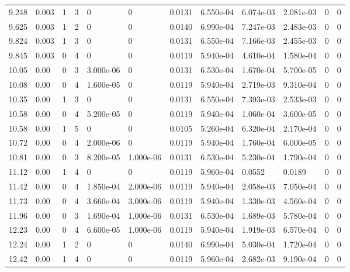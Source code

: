 \documentclass[preview]{standalone}
\begin{document}
{{{\begin{tabular}{L{1.2cm}C{1.2cm} C{0.3cm}C{0.5cm} C{1.4cm}C{1.4cm} C{1.4cm}C{1.4cm} C{1.6cm}C{1.6cm} C{1.6cm}C{1.6cm}}
  9.248  &  0.003  & 1     &  3 &  0  & 0  &  0.0131&   6.550e-04& 6.074e-03 & 2.081e-03   &  0 & 0  \\ 
  9.625  &  0.003  & 1     &  2 &  0  & 0  &  0.0140&   6.990e-04& 7.247e-03 & 2.483e-03   &  0 & 0  \\ 
  9.824  &  0.003  & 1     &  3 &  0  & 0  &  0.0131&   6.550e-04& 7.166e-03 & 2.455e-03   &  0 & 0  \\ 
  9.845  &  0.003  & 0     &  4 &  0  & 0  &  0.0119&   5.940e-04& 4.610e-04 & 1.580e-04   &  0 & 0  \\ 
  10.05  &  0.00  & 0     &  3 &  3.000e-06  & 0  &  0.0131&   6.530e-04& 1.670e-04 & 5.700e-05   &  0 & 0  \\ 
  10.08  &  0.00  & 0     &  4 &  1.600e-05  & 0  &  0.0119&   5.940e-04& 2.719e-03 & 9.310e-04   &  0 & 0  \\ 
  10.35  &  0.00  & 1     &  3 &  0  & 0  &  0.0131&   6.550e-04& 7.393e-03 & 2.533e-03   &  0 & 0  \\ 
  10.58  &  0.00  & 0     &  4 &  5.200e-05  & 0  &  0.0119&   5.940e-04& 1.060e-04 & 3.600e-05   &  0 & 0  \\ 
  10.58  &  0.00  & 1     &  5 &  0  & 0  &  0.0105&   5.260e-04& 6.320e-04 & 2.170e-04   &  0 & 0  \\ 
  10.72  &  0.00  & 0     &  4 &  2.000e-06  & 0  &  0.0119&   5.940e-04& 1.760e-04 & 6.000e-05   &  0 & 0  \\ 
  10.81  &  0.00  & 0     &  3 &  8.200e-05  & 1.000e-06  &  0.0131&   6.530e-04& 5.230e-04 & 1.790e-04   &  0 & 0  \\ 
  11.12  &  0.00  & 1     &  4 &  0  & 0  &  0.0119&   5.960e-04& 0.0552 & 0.0189   &  0 & 0  \\ 
  11.42  &  0.00  & 0     &  4 &  1.850e-04  & 2.000e-06  &  0.0119&   5.940e-04& 2.058e-03 & 7.050e-04   &  0 & 0  \\ 
  11.73  &  0.00  & 0     &  4 &  3.660e-04  & 3.000e-06  &  0.0119&   5.940e-04& 1.330e-03 & 4.560e-04   &  0 & 0  \\ 
  11.96  &  0.00  & 0     &  3 &  1.690e-04  & 1.000e-06  &  0.0131&   6.530e-04& 1.689e-03 & 5.780e-04   &  0 & 0  \\ 
  12.23  &  0.00  & 0     &  4 &  6.600e-05  & 1.000e-06  &  0.0119&   5.940e-04& 1.919e-03 & 6.570e-04   &  0 & 0  \\ 
  12.24  &  0.00  & 1     &  2 &  0  & 0  &  0.0140&   6.990e-04& 5.030e-04 & 1.720e-04   &  0 & 0  \\ 
  12.42  &  0.00  & 1     &  4 &  0  & 0  &  0.0119&   5.960e-04& 2.682e-03 & 9.190e-04   &  0 & 0  \\ 

\end{tabular}}}}
\end{document}
